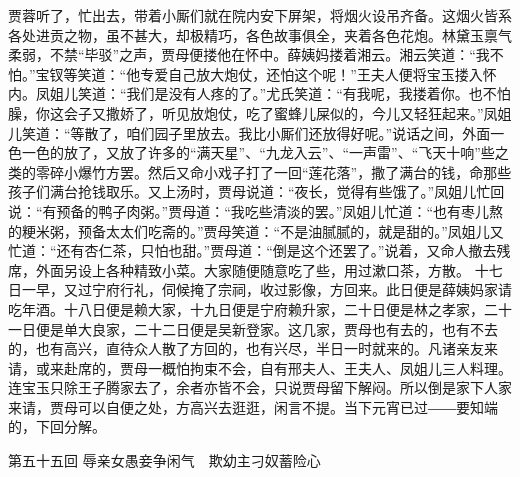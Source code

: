 \documentclass[12pt,oneside]{book}
\begin{document}
贾蓉听了，忙出去，带着小厮们就在院内安下屏架，将烟火设吊齐备。这烟火皆系各处进贡之物，虽不甚大，却极精巧，各色故事俱全，夹着各色花炮。林黛玉禀气柔弱，不禁“毕驳”之声，贾母便搂他在怀中。薛姨妈搂着湘云。湘云笑道：“我不怕。”宝钗等笑道：“他专爱自己放大炮仗，还怕这个呢！”王夫人便将宝玉搂入怀内。凤姐儿笑道：“我们是没有人疼的了。”尤氏笑道：“有我呢，我搂着你。也不怕臊，你这会子又撒娇了，听见放炮仗，吃了蜜蜂儿屎似的，今儿又轻狂起来。”凤姐儿笑道：“等散了，咱们园子里放去。我比小厮们还放得好呢。”说话之间，外面一色一色的放了，又放了许多的“满天星”、“九龙入云”、“一声雷”、“飞天十响”些之类的零碎小爆竹方罢。然后又命小戏子打了一回“莲花落”，撒了满台的钱，命那些孩子们满台抢钱取乐。又上汤时，贾母说道：“夜长，觉得有些饿了。”凤姐儿忙回说：“有预备的鸭子肉粥。”贾母道：“我吃些清淡的罢。”凤姐儿忙道：“也有枣儿熬的粳米粥，预备太太们吃斋的。”贾母笑道：“不是油腻腻的，就是甜的。”凤姐儿又忙道：“还有杏仁茶，只怕也甜。”贾母道：“倒是这个还罢了。”说着，又命人撤去残席，外面另设上各种精致小菜。大家随便随意吃了些，用过漱口茶，方散。
十七日一早，又过宁府行礼，伺候掩了宗祠，收过影像，方回来。此日便是薛姨妈家请吃年酒。十八日便是赖大家，十九日便是宁府赖升家，二十日便是林之孝家，二十一日便是单大良家，二十二日便是吴新登家。这几家，贾母也有去的，也有不去的，也有高兴，直待众人散了方回的，也有兴尽，半日一时就来的。凡诸亲友来请，或来赴席的，贾母一概怕拘束不会，自有邢夫人、王夫人、凤姐儿三人料理。连宝玉只除王子腾家去了，余者亦皆不会，只说贾母留下解闷。所以倒是家下人家来请，贾母可以自便之处，方高兴去逛逛，闲言不提。当下元宵已过――要知端的，下回分解。
















 
第五十五回  辱亲女愚妾争闲气　欺幼主刁奴蓄险心
\end{document}
